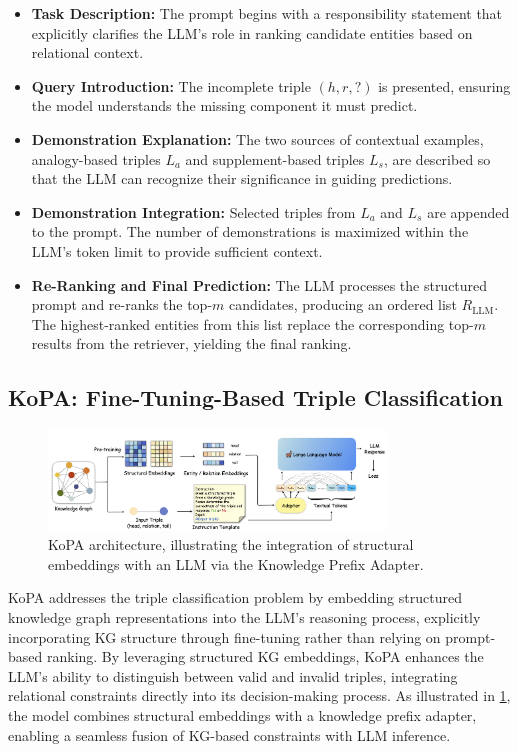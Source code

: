 \documentclass[12pt,a4paper]{article}
\begin{document}
\begin{itemize}
    \item \textbf{Task Description:} The prompt begins with a responsibility statement that explicitly clarifies the LLM’s role in ranking candidate entities based on relational context.
    \item \textbf{Query Introduction:} The incomplete triple \( (h, r, ?) \) is presented, ensuring the model understands the missing component it must predict.
    \item \textbf{Demonstration Explanation:} The two sources of contextual examples, analogy-based triples \( L_a \) and supplement-based triples \( L_s \), are described so that the LLM can recognize their significance in guiding predictions.
    \item \textbf{Demonstration Integration:} Selected triples from \( L_a \) and \( L_s \) are appended to the prompt. The number of demonstrations is maximized within the LLM’s token limit to provide sufficient context.
    \item \textbf{Re-Ranking and Final Prediction:} The LLM processes the structured prompt and re-ranks the top-\( m \) candidates, producing an ordered list \( R_{\text{LLM}} \). The highest-ranked entities from this list replace the corresponding top-\( m \) results from the retriever, yielding the final ranking.
\end{itemize}


\subsection{KoPA: Fine-Tuning-Based Triple Classification}

\begin{figure}
    \centering
    \includegraphics[width=0.8\textwidth]{figures/KoPAarchitecture}
    \caption{KoPA architecture, illustrating the integration of structural embeddings with an LLM via the Knowledge Prefix Adapter.}
    \label{fig:KoPAarchitecture}
\end{figure}

KoPA addresses the triple classification problem by embedding structured knowledge graph representations into the LLM’s reasoning process, explicitly incorporating KG structure through fine-tuning rather than relying on prompt-based ranking.
By leveraging structured KG embeddings, KoPA enhances the LLM’s ability to distinguish between valid and invalid triples, integrating relational constraints directly into its decision-making process.
As illustrated in \cref{fig:KoPAarchitecture}, the model combines structural embeddings with a knowledge prefix adapter, enabling a seamless fusion of KG-based constraints with LLM inference.
\end{document}

